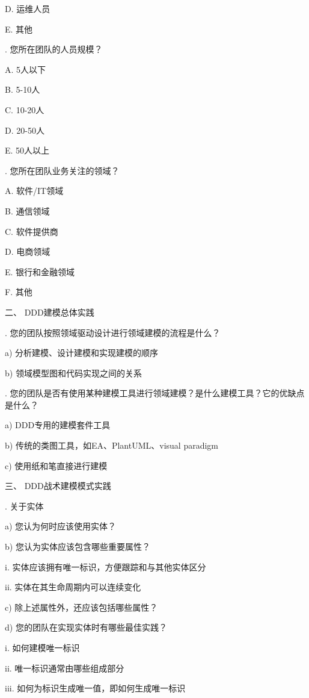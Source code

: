 \documentclass[macfonts,master,oneside]{njuthesis}
\begin{document}
\noindent
D.	运维人员

\noindent
E.	其他

.	您所在团队的人员规模？

\noindent
A.		5人以下

\noindent
B.	5-10人

\noindent
 C.	10-20人

\noindent
 D.	20-50人

\noindent
 E.	50人以上

.	您所在团队业务关注的领域？

\noindent
A.	软件/IT领域

\noindent
B.	通信领域

\noindent
C.	软件提供商

\noindent
D.	电商领域

\noindent
E.	银行和金融领域

\noindent
F.	其他

\noindent
二、	DDD建模总体实践

.	您的团队按照领域驱动设计进行领域建模的流程是什么？

\noindent
a)	分析建模、设计建模和实现建模的顺序

\noindent
b)	领域模型图和代码实现之间的关系

.	您的团队是否有使用某种建模工具进行领域建模？是什么建模工具？它的优缺点是什么？ 

\noindent
a)	DDD专用的建模套件工具

\noindent
b)	传统的类图工具，如EA、PlantUML、visual paradigm

\noindent
c)	使用纸和笔直接进行建模

\noindent
三、	DDD战术建模模式实践

.	关于实体

\noindent
a)	您认为何时应该使用实体？

\noindent
b)	您认为实体应该包含哪些重要属性？

\noindent
i.	实体应该拥有唯一标识，方便跟踪和与其他实体区分

\noindent
ii.	实体在其生命周期内可以连续变化

\noindent
c)	除上述属性外，还应该包括哪些属性？

\noindent
d)	您的团队在实现实体时有哪些最佳实践？

\noindent
i.	如何建模唯一标识

\noindent
ii.	唯一标识通常由哪些组成部分

\noindent
iii.	如何为标识生成唯一值，即如何生成唯一标识
\end{document}
